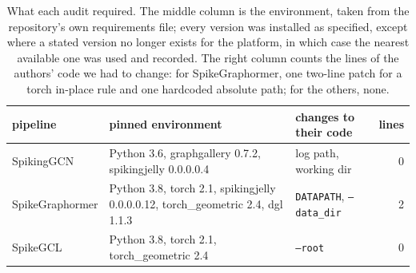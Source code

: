 \begin{table}[t]
\centering
\footnotesize
\caption{What each audit required. The middle column is the environment, taken from the repository's own requirements file; every version was installed as specified, except where a stated version no longer exists for the platform, in which case the nearest available one was used and recorded. The right column counts the lines of the authors' code we had to change: for SpikeGraphormer, one two-line patch for a torch in-place rule and one hardcoded absolute path; for the others, none.}\label{tab:protocol}
\begin{tabular}{p{2.1cm}p{3.9cm}p{2.6cm}r}
\toprule
pipeline & pinned environment & changes to their code & lines \\
\midrule
SpikingGCN & Python 3.6, graphgallery 0.7.2, spikingjelly 0.0.0.0.4 & log path, working dir & 0 \\
SpikeGraphormer & Python 3.8, torch 2.1, spikingjelly 0.0.0.0.12, torch\_geometric 2.4, dgl 1.1.3 & \texttt{DATAPATH}, \texttt{--data\_dir} & 2 \\
SpikeGCL & Python 3.8, torch 2.1, torch\_geometric 2.4 & \texttt{--root} & 0 \\
\bottomrule
\end{tabular}
\end{table}
